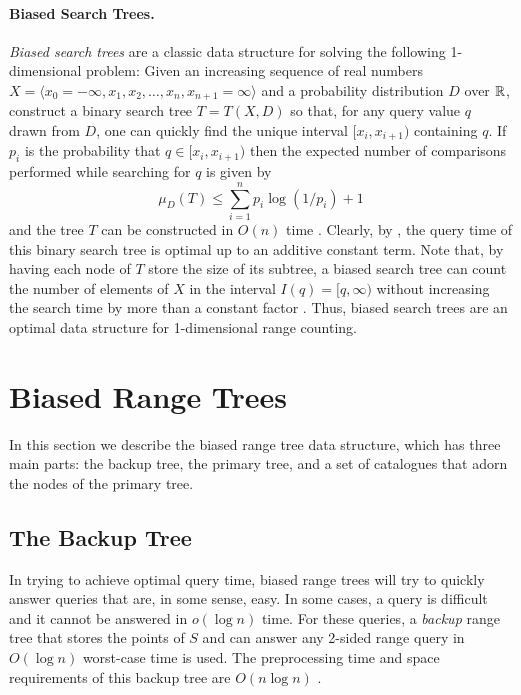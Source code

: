 \documentclass{patmorin}
\begin{document}
\paragraph{Biased Search Trees.}

\emph{Biased search trees} are a classic data structure for solving
the following 1-dimensional problem:  Given an increasing sequence of
real numbers $X=\langle x_0=-\infty,x_1,x_2,\ldots ,
x_n,x_{n+1}=\infty\rangle$ and a probability distribution $D$ over
$\mathbb{R}$, construct a binary search tree  $T=T(X,D)$ so that, for any
query value $q$ drawn from $D$, one can quickly find the unique
interval $[x_i,x_{i+1})$ containing $q$.  If $p_i$ is the probability
that $q\in[x_i,x_{i+1})$ then the expected number of comparisons
performed while searching for $q$ is given
by
\[
   \mu_D(T) \le \sum_{i=1}^{n} p_i\log(1/p_i) + 1 
\]
and the tree $T$ can be constructed in $O(n)$ time \cite{m75}.  Clearly,
by , the query time of this binary search tree is
optimal up to an additive constant term.  Note that, by having each
node of $T$ store the size of its subtree, a biased search tree can
count the number of elements of $X$ in the interval $I(q)=[q,\infty)$
without increasing the search time by more than a constant factor
\cite[Chapter~14]{clrs09}. Thus, biased search trees are an optimal data
structure for 1-dimensional range counting.

\section{Biased Range Trees}

In this section we describe the biased range tree data structure,
which has three main parts: the backup tree, the primary tree, and a
set of catalogues that adorn the nodes of the primary tree.

\subsection{The Backup Tree}

In trying to achieve optimal query time, biased range trees will try
to quickly answer queries that are, in some sense, easy.  In some
cases, a query is difficult and it cannot be answered in $o(\log n)$
time.  For these queries, a \emph{backup} range tree that stores the
points of $S$ and can answer any 2-sided range query in $O(\log n)$
worst-case time is used.  The preprocessing time and space
requirements of this backup tree are $O(n\log n)$ \cite{bkos97}.
\end{document}
